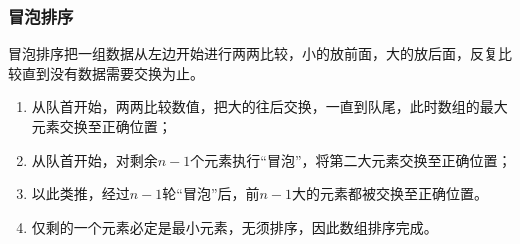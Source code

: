 \begin{frame}
    \frametitle{冒泡排序}
    冒泡排序把一组数据从左边开始进行两两比较，小的放前面，大的放后面，反复比较直到没有数据需要交换为止。
    \begin{enumerate}
      \item 从队首开始，两两比较数值，把大的往后交换，一直到队尾，此时数组的最大元素交换至正确位置；
      \item 从队首开始，对剩余$n-1$个元素执行“冒泡”，将第二大元素交换至正确位置；
      \item 以此类推，经过$n-1$轮“冒泡”后，前$n-1$大的元素都被交换至正确位置。
      \item 仅剩的一个元素必定是最小元素，无须排序，因此数组排序完成。
    \end{enumerate}
\end{frame}


